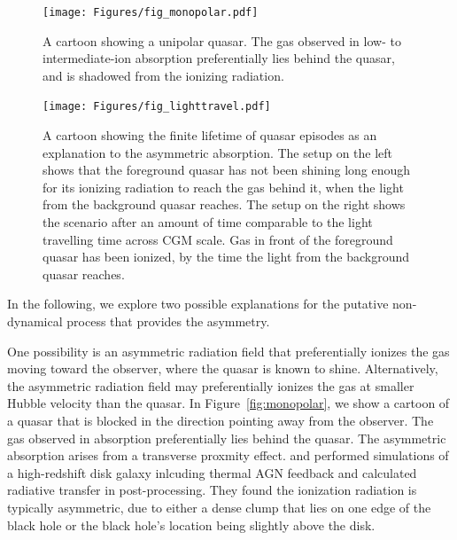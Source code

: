 \documentclass[iop]{emulateapj}
\begin{document}
\begin{figure}[!th]
\begin{minipage}[!bp]{0.28\textwidth}
\texttt{[image: Figures/fig\_monopolar.pdf]}
\caption{A cartoon showing a unipolar quasar. The gas observed in low- to intermediate-ion 
absorption preferentially lies behind the quasar, and is shadowed from the ionizing radiation. 
}
\label{fig:monopolar}
\end{minipage}%
\hspace{0.3in}
\begin{minipage}[!bp]{0.67\textwidth}
\texttt{[image: Figures/fig\_lighttravel.pdf]}
\caption{A cartoon showing the finite lifetime of quasar episodes as an explanation to the 
asymmetric absorption. The setup on the left shows that the foreground quasar has not been shining 
long enough for its ionizing radiation to reach the gas behind it, when the light from the 
background quasar reaches. The setup on the right shows the scenario after an amount of time 
comparable to the light travelling time across CGM scale. Gas in front of the foreground quasar 
has been ionized, by the time the light from the background quasar reaches. 
}
\label{fig:lighttravel}
\end{minipage}
\end{figure}

In the following, we explore two possible explanations for the putative non-dynamical process that 
provides the asymmetry. 

One possibility is an asymmetric radiation field that preferentially ionizes the gas moving toward 
the observer, where the quasar is known to shine. Alternatively, the asymmetric radiation field 
may preferentially ionizes the gas at smaller Hubble velocity than the quasar. In 
Figure~\ref{fig:monopolar}, we show a cartoon of a quasar that is blocked in the direction 
pointing away from the observer. The gas observed in absorption preferentially lies behind the 
quasar. The asymmetric absorption arises from a transverse proxmity effect. 
\cite{Roos+15} and \cite{GaborBournaud14} performed simulations of a high-redshift disk galaxy 
inlcuding thermal AGN feedback and calculated radiative transfer in post-processing. They found 
the ionization radiation is typically asymmetric, due to either a dense clump that lies on one 
edge of the black hole or the black hole's location being slightly above the disk. 
\end{document}
